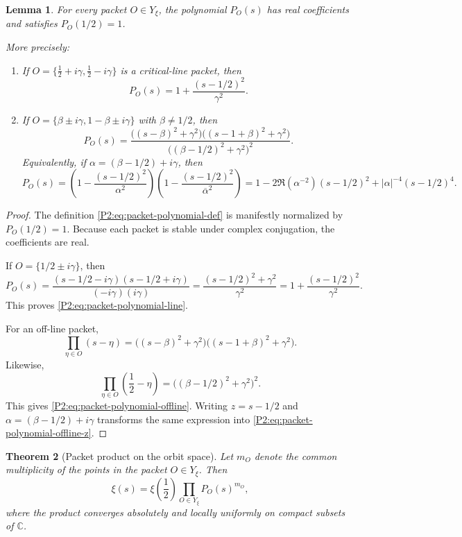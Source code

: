 \documentclass[11pt,a4paper]{article}
\numberwithin{equation}{section}
\newtheorem{theorem}{Theorem}[section]
\newtheorem{lemma}[theorem]{Lemma}
\theoremstyle{definition}
\theoremstyle{remark}
\newcommand{\CC}{\mathbb C}
\begin{document}
\begin{lemma}\label{P2:lem:packet-polynomial-explicit}
For every packet $O\in Y_\xi$, the polynomial $P_O(s)$ has real coefficients and satisfies $P_O(1/2)=1$.

More precisely:
\begin{enumerate}[label=(\roman*)]
\item If $O=\{\frac12+i\gamma,\frac12-i\gamma\}$ is a critical-line packet, then
\begin{equation}\label{P2:eq:packet-polynomial-line}
P_O(s)=1+\frac{(s-1/2)^2}{\gamma^2}.
\end{equation}
\item If $O=\{\beta\pm i\gamma,1-\beta\pm i\gamma\}$ with $\beta\neq 1/2$, then
\begin{equation}\label{P2:eq:packet-polynomial-offline}
P_O(s)=\frac{\bigl((s-\beta)^2+\gamma^2\bigr)\bigl((s-1+\beta)^2+\gamma^2\bigr)}{\bigl((\beta-1/2)^2+\gamma^2\bigr)^2}.
\end{equation}
Equivalently, if $\alpha=(\beta-1/2)+i\gamma$, then
\begin{equation}\label{P2:eq:packet-polynomial-offline-z}
P_O(s)=\left(1-\frac{(s-1/2)^2}{\alpha^2}\right)\left(1-\frac{(s-1/2)^2}{\overline\alpha^2}\right)
=1-2\Re(\alpha^{-2})(s-1/2)^2+|\alpha|^{-4}(s-1/2)^4.
\end{equation}
\end{enumerate}
\end{lemma}

\begin{proof}
The definition \eqref{P2:eq:packet-polynomial-def} is manifestly normalized by $P_O(1/2)=1$.  Because each packet is stable under complex conjugation, the coefficients are real.

If $O=\{1/2\pm i\gamma\}$, then
\[
P_O(s)=\frac{(s-1/2-i\gamma)(s-1/2+i\gamma)}{(-i\gamma)(i\gamma)}
=\frac{(s-1/2)^2+\gamma^2}{\gamma^2}
=1+\frac{(s-1/2)^2}{\gamma^2}.
\]
This proves \eqref{P2:eq:packet-polynomial-line}.

For an off-line packet,
\[
\prod_{\eta\in O}(s-\eta)=\bigl((s-\beta)^2+\gamma^2\bigr)\bigl((s-1+\beta)^2+\gamma^2\bigr).
\]
Likewise,
\[
\prod_{\eta\in O}\left(\frac12-\eta\right)=\bigl((\beta-1/2)^2+\gamma^2\bigr)^2.
\]
This gives \eqref{P2:eq:packet-polynomial-offline}.  Writing $z=s-1/2$ and $\alpha=(\beta-1/2)+i\gamma$ transforms the same expression into \eqref{P2:eq:packet-polynomial-offline-z}.
\end{proof}

\begin{theorem}[Packet product on the orbit space]\label{P2:thm:packet-product-on-Y}
Let $m_O$ denote the common multiplicity of the points in the packet $O\in Y_\xi$.  Then
\begin{equation}\label{P2:eq:packet-product-on-Y}
\xi(s)=\xi\!\left(\frac12\right)\prod_{O\in Y_\xi} P_O(s)^{m_O},
\end{equation}
where the product converges absolutely and locally uniformly on compact subsets of $\CC$.
\end{theorem}
\end{document}
